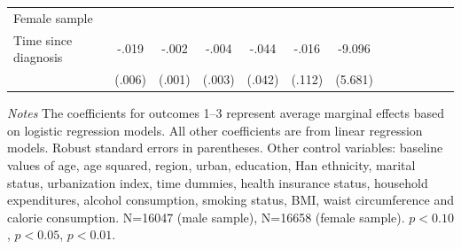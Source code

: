 \begin{table}[!ht]
\begin{adjustbox}{max width=\linewidth}
\begin{threeparttable}
{\begin{tabular}{l*{6}{S
S}}
Female sample &&&&&&\\
Time since diagnosis&  -.019\sym{***}&    -.002         &    -.004         &    -.044         &    -.016         &   -9.096         \\
                &   (.006)         &   (.001)         &   (.003)         &   (.042)         &   (.112)         &  (5.681)         \\          
\bottomrule
\end{tabular}
\begin{tablenotes}
\item \footnotesize \textit{Notes} The coefficients for outcomes 1--3 represent average marginal effects based on logistic regression models. All other coefficients are from linear regression models. Robust standard errors in parentheses.
Other control variables: baseline values of age, age squared, region, urban, education, Han ethnicity, marital status, urbanization index, time dummies, health insurance status, household expenditures, alcohol consumption, smoking status, BMI, waist circumference and calorie consumption. N=16047 (male sample), N=16658 (female sample). \sym{*} \(p<0.10\), \sym{**} \(p<0.05\), \sym{***} \(p<0.01\).
\end{tablenotes}
}
\end{threeparttable}
\end{adjustbox}
\end{table}

\clearpage

